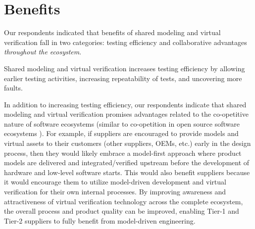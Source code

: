 \section{Benefits} \label{sec:benefits}
Our respondents indicated that %
benefits of shared modeling and virtual verification fall in two categories:
testing efficiency and collaborative advantages \emph{throughout the ecosystem}.

Shared modeling and virtual verification increases testing efficiency by allowing earlier testing activities, increasing repeatability of tests, and uncovering more faults. 


In addition to increasing testing efficiency, our respondents indicate that shared modeling and virtual verification promises advantages related to the co-opetitive nature of software ecosystems (similar to co-opetition in open source software ecosystems \cite{Agerfalk2008}).
%
%
For example, if suppliers are encouraged to provide models and virtual assets to their customers (other suppliers, OEMs, etc.) early in the design process, then they would likely embrace a model-first approach where product models are delivered and integrated/verified upstream before the development of hardware and low-level software starts.
This would also benefit suppliers because it would encourage them to utilize model-driven development and virtual verification for their own internal processes.
By improving awareness and attractiveness of virtual verification technology across the complete ecosystem, the overall process and product quality can be improved, enabling Tier-1 and Tier-2 suppliers to fully benefit from model-driven engineering.


